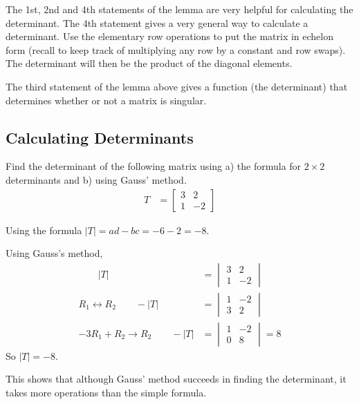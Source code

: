 The 1st, 2nd and 4th statements of the lemma are very helpful for calculating the determinant.  The 4th statement gives a very general way to calculate a determinant.  Use the elementary row operations to put the matrix in echelon form (recall to keep track of multiplying any row by a constant and row swaps).  The determinant will then be the product of the diagonal elements.

The third statement of the lemma above gives a function (the determinant) that determines whether or not a matrix is singular.

\subsection{Calculating Determinants}

\begin{example}
Find the determinant of the following matrix using a) the formula for $2 \times 2$ determinants and b) using Gauss' method.
%
\begin{align*}
T & = \begin{bmatrix}
3 & 2 \\
1 & -2
\end{bmatrix}
\end{align*}

\solution

Using the formula $|T| = ad-bc=-6-2=-8$.

Using Gauss's method,
%
\begin{align*}
 \qquad |T|  &= \begin{vmatrix}
3 & 2 \\
1 & -2
\end{vmatrix} \\
R_1 \leftrightarrow R_2 \qquad
-|T|&=  \begin{vmatrix}
1 & -2 \\
3 & 2
\end{vmatrix} \\
-3R_1 + R_2 \rightarrow R_2 \qquad
-|T|&=  \begin{vmatrix}
1 & -2 \\
0 & 8
\end{vmatrix} = 8
\end{align*}
So $|T|=-8$.

This shows that although Gauss' method succeeds in finding the determinant, it takes more operations than the simple formula.
\end{example}


